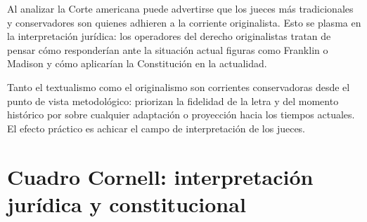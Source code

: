 \documentclass[12pt,oneside]{book}
\begin{document}
Al analizar la Corte americana puede advertirse que los jueces más tradicionales y conservadores son quienes adhieren a la corriente originalista. Esto se plasma en la interpretación jurídica: los operadores del derecho originalistas tratan de pensar cómo responderían ante la situación actual figuras como Franklin o Madison y cómo aplicarían la Constitución en la actualidad.

\begin{important}
Tanto el textualismo como el originalismo son corrientes conservadoras desde el punto de vista metodológico: priorizan la fidelidad de la letra y del momento histórico por sobre cualquier adaptación o proyección hacia los tiempos actuales. El efecto práctico es achicar el campo de interpretación de los jueces.
\end{important}

\section{Cuadro Cornell: interpretación jurídica y constitucional}
\end{document}

